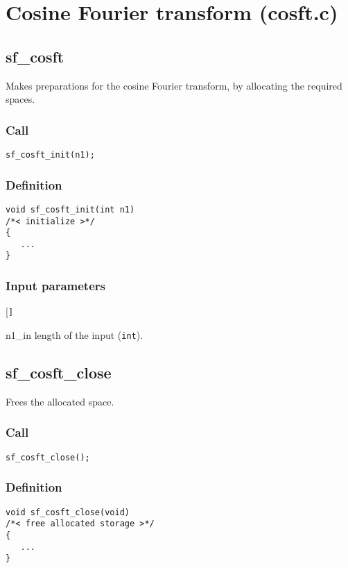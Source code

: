 \section{Cosine Fourier transform (cosft.c)}




\subsection{{sf\_cosft}}
Makes preparations for the cosine Fourier transform, by allocating the required spaces.

\subsubsection*{Call}
\begin{verbatim}sf_cosft_init(n1);\end{verbatim}

\subsubsection*{Definition}
\begin{verbatim}
void sf_cosft_init(int n1)
/*< initialize >*/ 
{
   ...
}
\end{verbatim}

\subsubsection*{Input parameters}
\begin{desclist}{\tt }{\quad}[\tt ]
   \setlength\itemsep{0pt}
   \item[n1\_in] length of the input (\texttt{int}).  
\end{desclist}



\subsection{{sf\_cosft\_close}}
Frees the allocated space.

\subsubsection*{Call}
\begin{verbatim}sf_cosft_close();\end{verbatim}

\subsubsection*{Definition}
\begin{verbatim}
void sf_cosft_close(void) 
/*< free allocated storage >*/
{
   ...
}
\end{verbatim}




